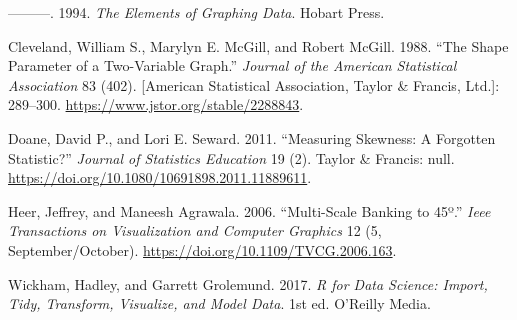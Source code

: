 \documentclass[]{book}
\theoremstyle{plain}
\theoremstyle{remark}
\theoremstyle{definition}
\theoremstyle{definition}
\theoremstyle{definition}
\theoremstyle{remark}
\begin{document}
\leavevmode\hypertarget{ref-Cleveland1994}{}%
---------. 1994. \emph{The Elements of Graphing Data}. Hobart Press.

\leavevmode\hypertarget{ref-ClevelandMcGillMcGill1988}{}%
Cleveland, William S., Marylyn E. McGill, and Robert McGill. 1988. ``The
Shape Parameter of a Two-Variable Graph.'' \emph{Journal of the American
Statistical Association} 83 (402). {[}American Statistical Association,
Taylor \& Francis, Ltd.{]}: 289--300.
\url{https://www.jstor.org/stable/2288843}.

\leavevmode\hypertarget{ref-DoaneSeward2011}{}%
Doane, David P., and Lori E. Seward. 2011. ``Measuring Skewness: A
Forgotten Statistic?'' \emph{Journal of Statistics Education} 19 (2).
Taylor \& Francis: null.
\url{https://doi.org/10.1080/10691898.2011.11889611}.

\leavevmode\hypertarget{ref-HeerAgrawala2006}{}%
Heer, Jeffrey, and Maneesh Agrawala. 2006. ``Multi-Scale Banking to
45º.'' \emph{Ieee Transactions on Visualization and Computer Graphics}
12 (5, September/October). \url{https://doi.org/10.1109/TVCG.2006.163}.

\leavevmode\hypertarget{ref-WickhamGrolemund2017}{}%
Wickham, Hadley, and Garrett Grolemund. 2017. \emph{R for Data Science:
Import, Tidy, Transform, Visualize, and Model Data}. 1st ed. O'Reilly
Media.
\end{document}
